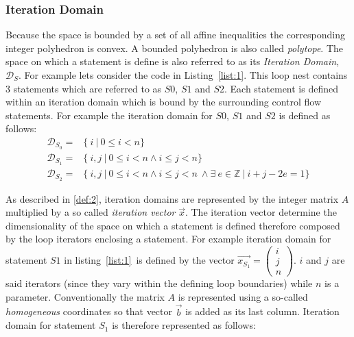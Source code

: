 \subsubsection{Iteration Domain}
Because the space is bounded by a set of all affine inequalities the
corresponding integer polyhedron is convex. A bounded polyhedron is also called
\emph{polytope}. The space on which a statement is define is also referred to as
its \emph{Iteration Domain}, $\mathcal{D}_S$. For example lets consider the code in
Listing~\ref{list:1}. This loop nest contains 3 statements which are referred to
as $S0$, $S1$ and $S2$. Each statement is defined within an iteration domain
which is bound by the surrounding control flow statements. For example the
iteration domain for $S0$, $S1$ and $S2$ is defined as follows:
\begin{align*}
	\mathcal{D}_{S_0} = & \{~i~|~0 \le i < n \} \\
	\mathcal{D}_{S_1} = & \{~i,j~|~ 0 \le i < n \wedge i \le j < n \} \\
	\mathcal{D}_{S_2} = & \{~i,j~|~ 0 \le i < n \wedge i \le j < n ~\wedge  
						\exists~e \in \mathbb{Z}~|~ i+j-2e=1 \}
\end{align*}

As described in \ref{def:2}, iteration domains are represented by the integer
matrix $A$ multiplied by a so called \emph{iteration vector} $\vec{x}$. The
iteration vector determine the dimensionality of the space on which a statement
is defined therefore composed by the loop iterators enclosing a statement. For
example iteration domain for statement $S1$ in listing~\ref{list:1}~is defined
by the vector $\vec{x_{S_1}} = \begin{pmatrix} i \\ j \\ n\end{pmatrix}$.
$i$ and $j$ are said iterators (since they vary within the defining loop
boundaries) while $n$ is a parameter. 
Conventionally the matrix $A$ is represented using a so-called
\emph{homogeneous} coordinates so that vector $\vec{b}$ is added as its last
column. Iteration domain for statement $S_1$ is therefore represented as
follows:

